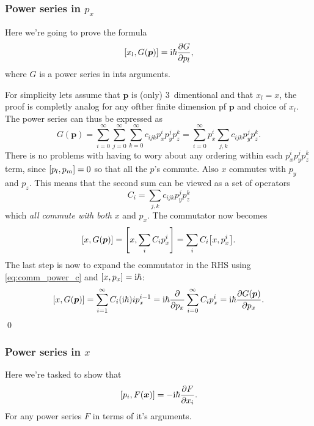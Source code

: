 \documentclass[11pt,letter, swedish, english
]{article}
\begin{document}
\subsubsection{Power series in $p_x$} \label{sec:p_power}
Here we're going to prove the formula
\begin{equation} \label{eq:p_power}
\comm{x_l}{G(\mathbf{p})}=\ii\hbar\pdv{G}{p_l},
\end{equation}
where $G$ is a power series in ints arguments. 

For simplicity lets
assume that $\mathbf{p}$ is (only) 3~dimentional and that $x_l=x$, the proof is
completly analog for any ofther finite dimension pf $\mathbf{p}$ and
choice of $x_l$. 
The power series can thus be expressed as
\begin{equation}
G(\mathbf{p}) 
= \sum_{i=0}^\infty\sum_{j=0}^\infty\sum_{k=0}^\infty
c_{ijk}p_x^ip_y^jp_z^k = \sum_{i=0}^\infty p_x^i \sum_{j,k}c_{ijk}p_y^jp_z^k.
\end{equation}
There is no problems with having to wory about any ordering within
each $p_x^ip_y^jp_z^k$ term, since $\comm{p_l}{p_m}=0$ so that all the
$p$'s commute. Also $x$ commutes with $p_y$ and $p_z$. This means that
the second sum can be viewed as a set of operators
\begin{equation}
C_i=\sum_{j,k}c_{ijk}p_y^jp_z^k
\end{equation}
which \emph{all commute with both} $x$ and $p_x$. The commutator now becomes
\begin{equation}
\comm{x}{G(\mathbf{p})} = \comm{x}{\sum_i C_ip_x^i}=\sum_i C_i \comm{x}{p_x^i}.
\end{equation}
The last step is now to expand the commutator in the RHS using
\eqref{eq:comm_power_c} and $\comm{x}{p_x}=\ii\hbar$:
\begin{equation}
\comm{x}{G(\mathbf{p})} = \sum_{i=1}^\infty C_i (\ii\hbar) ip_x^{i-1}
= \ii\hbar \pdv{p_x}\sum_{i=0}^\infty C_i p_x^{i}
= \ii\hbar \pdv{G(\mathbf{p})}{p_x}.
\end{equation}
\qed


\subsubsection{Power series in $x$}
Here we're tasked to show that
\begin{equation} \label{eq:x_power}
\comm{p_i}{F(\mathbf{x})}=-\ii\hbar\pdv{F}{x_i}.
\end{equation}
For any power series $F$ in terms of it's arguments.
\end{document}

